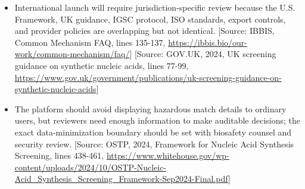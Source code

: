 \documentclass[11pt]{report}
\begin{document}
\begin{itemize}
\item International launch will require jurisdiction-specific review because the U.S. Framework, UK guidance, IGSC protocol, ISO standards, export controls, and provider policies are overlapping but not identical. [Source: IBBIS, Common Mechanism FAQ, lines 135-137, \url{https://ibbis.bio/our-work/common-mechanism/faq/}] [Source: GOV.UK, 2024, UK screening guidance on synthetic nucleic acids, lines 77-99, \url{https://www.gov.uk/government/publications/uk-screening-guidance-on-synthetic-nucleic-acids}]
\item The platform should avoid displaying hazardous match details to ordinary users, but reviewers need enough information to make auditable decisions; the exact data-minimization boundary should be set with biosafety counsel and security review. [Source: OSTP, 2024, Framework for Nucleic Acid Synthesis Screening, lines 438-461, \url{https://www.whitehouse.gov/wp-content/uploads/2024/10/OSTP-Nucleic-Acid_Synthesis_Screening_Framework-Sep2024-Final.pdf}]
\end{itemize}
\end{document}
